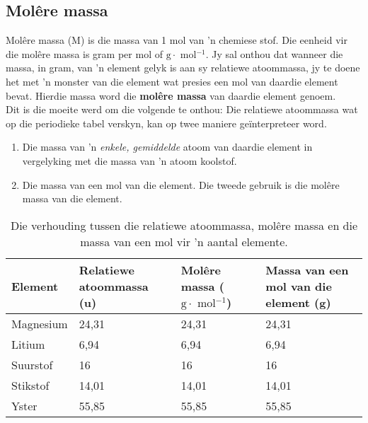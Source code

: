             \subsection*{Mol\^{e}re massa}
            \nopagebreak
{} { Mol\^{e}re massa (M) is die massa van 1 mol van 'n chemiese stof. Die eenheid vir die mol\^{e}re massa is gram per mol of $\text{g}\ensuremath{\cdot}\text{ mol}{}^{-1}$. } 
Jy sal onthou dat wanneer die massa, in gram, van 'n element gelyk is aan sy relatiewe atoommassa, jy te doene het met  'n monster van die element wat presies een mol van daardie element bevat. Hierdie massa word die \textbf{mol\^{e}re massa} van daardie element genoem.\\
\label{m38717*id276445}Dit is die moeite werd om die volgende te onthou: Die relatiewe atoommassa wat op die periodieke tabel verskyn, kan op twee maniere geïnterpreteer word.
\begin{enumerate}[noitemsep, label=\textbf{\arabic*}. ] 
\item Die massa van 'n \textsl{enkele, gemiddelde} atoom van daardie element in vergelyking met die massa van 'n atoom koolstof.
\item Die massa van een mol van die element. Die tweede gebruik is die mol\^{e}re massa van die element.
\end{enumerate}
          \begin{table}[H]
        \begin{center}
      \label{m38717*uid11}
    \noindent
      \begin{tabular}{|l|l|l|p{3cm}|}\hline
                \textbf{Element}
               &
                \textbf{Relatiewe atoommassa (u)}
               &
                \textbf{Mol\^{e}re massa ($\text{g}\ensuremath{\cdot}\text{ mol}{}^{-1}$)}
               &
                \textbf{Massa van een mol van die element (g)} \\ \hline
        Magnesium &
        24,31 &
        24,31 &
        24,31 \\ \hline
        Litium &
        6,94 &
        6,94 &
        6,94 \\ \hline
        Suurstof &
        16 &
        16 &
        16 \\ \hline
        Stikstof &
        14,01 &
        14,01 &
        14,01  \\ \hline
        Yster &
        55,85 &
        55,85 &
        55,85 \\ \hline
    \end{tabular}
      \end{center}
    \caption{Die verhouding tussen die relatiewe atoommassa, mol\^{e}re massa en die massa van een mol vir 'n aantal elemente.}
\end{table}
\clearpage

